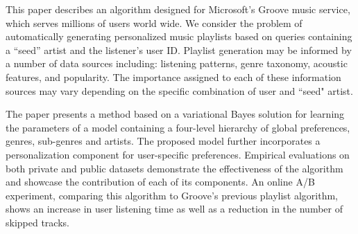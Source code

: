 This paper describes an algorithm designed for Microsoft's Groove music service, which serves millions of users world wide.  We consider the problem of automatically generating personalized music playlists based on queries containing a ``seed'' artist and the listener's user ID. 
Playlist generation may be informed by a number of data sources including: listening patterns, genre taxonomy, acoustic features, and popularity. The importance assigned to each of these information sources may vary depending on the specific combination of user and ``seed" artist.

The paper presents a method based on a variational Bayes solution for learning the parameters of a model containing a four-level hierarchy of global preferences, genres, sub-genres and artists. The proposed model further incorporates a personalization component for user-specific preferences.
Empirical evaluations on both private and public datasets demonstrate the effectiveness of the algorithm and showcase the contribution of each of its components. An online A/B experiment, comparing this algorithm to Groove's previous playlist algorithm, shows an increase in user listening time as well as a reduction in the number of skipped tracks.

 
